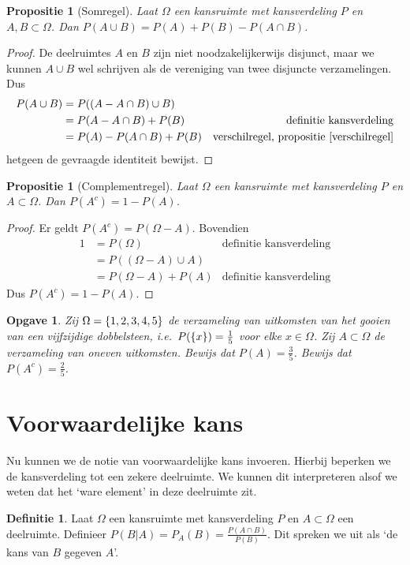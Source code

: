 \documentclass[a4paper]{book}
\newtheorem{proposition}[theorem]{Propositie}
\newtheorem{exercise}[theorem]{Opgave}
\theoremstyle{definition}
\newtheorem{definition}[theorem]{Definitie}
\begin{document}
\begin{proposition}[Somregel]\label{somregel}
    Laat $\Omega$ een kansruimte met kansverdeling $P$ en $A,B \subset \Omega$.
    Dan $P(A \cup B) = P(A) + P(B) - P(A \cap B)$.
\end{proposition}
\begin{proof}
    De deelruimtes $A$ en $B$ zijn niet noodzakelijkerwijs disjunct, maar we kunnen $A \cup B$ wel schrijven als de vereniging van twee disjuncte verzamelingen.
    Dus
    \begin{align*}
        P(A \cup B)     &= P( (A - A \cap B) \cup B) \\
                        &= P(A - A \cap B) + P(B)  & \text{definitie kansverdeling}\\
                        &= P(A) - P(A \cap B) + P(B) & \text{verschilregel, propositie~\ref{verschilregel}}
    \end{align*}
    hetgeen de gevraagde identiteit bewijst.
\end{proof}

\begin{proposition}[Complementregel]\label{complementregel}
    Laat $\Omega$ een kansruimte met kansverdeling $P$ en $A \subset \Omega$.
    Dan $P(A^c) = 1 - P(A)$.
\end{proposition}
\begin{proof}
    Er geldt $P(A^c) = P(\Omega - A)$.
    Bovendien
    \begin{align*}
        1 &= P(\Omega) & \text{definitie kansverdeling}\\
          &= P( (\Omega - A) \cup A) \\
          &= P(\Omega - A) + P(A) & \text{definitie kansverdeling}
    \end{align*}
    Dus $P(A^c) = 1 - P(A)$.
\end{proof}


\begin{exercise}
    Zij $\Omega = \set{1,2,3,4,5}$ de verzameling van uitkomsten van het gooien van een vijfzijdige dobbelsteen,
    i.e.\ $P(\set{x}) = \frac{1}{5}$ voor elke $x \in \Omega$.
    Zij $A \subset \Omega$ de verzameling van oneven uitkomsten.
    Bewijs dat $P(A) = \frac{3}{5}$.
    Bewijs dat $P(A^c) = \frac{2}{5}$.
\end{exercise}


\section{Voorwaardelijke kans}
Nu kunnen we de notie van voorwaardelijke kans invoeren.
Hierbij beperken we de kansverdeling tot een zekere deelruimte.
We kunnen dit interpreteren alsof we weten dat het `ware element' in deze deelruimte zit.
\begin{definition}
    Laat $\Omega$ een kansruimte met kansverdeling $P$ en $A \subset \Omega$ een deelruimte.
    Definieer $P(B|A) = P_A(B) = \frac{P(A \cap B)}{P(B)}$. Dit spreken we uit als `de kans van $B$ gegeven $A$'.
\end{definition}
\end{document}
